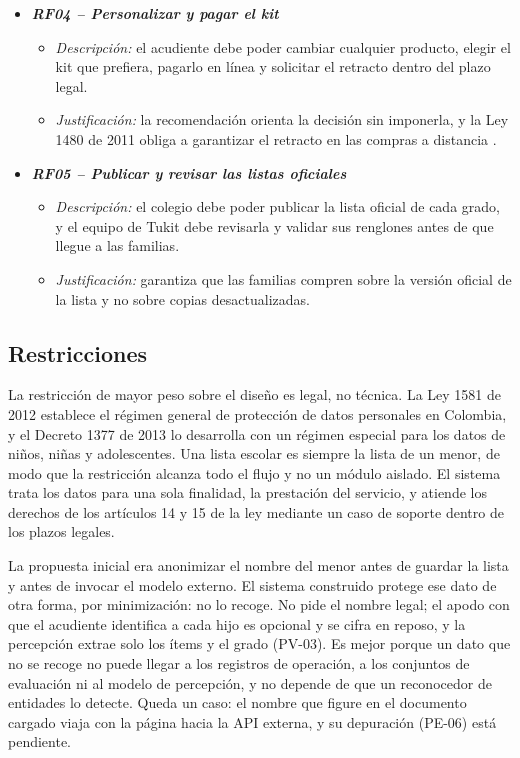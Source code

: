 \begin{itemize}
  \item \textbf{\textit{RF04 -- Personalizar y pagar el kit}}
    \begin{itemize}
      \item \textit{Descripción:} el acudiente debe poder cambiar cualquier producto, elegir
            el kit que prefiera, pagarlo en línea y solicitar el retracto dentro del plazo
            legal.
      \item \textit{Justificación:} la recomendación orienta la decisión sin imponerla, y la
            Ley 1480 de 2011 obliga a garantizar el retracto en las compras a distancia
            \citep{congreso_ley1480_2011}.
    \end{itemize}

  \item \textbf{\textit{RF05 -- Publicar y revisar las listas oficiales}}
    \begin{itemize}
      \item \textit{Descripción:} el colegio debe poder publicar la lista oficial de cada
            grado, y el equipo de Tukit debe revisarla y validar sus renglones antes de que
            llegue a las familias.
      \item \textit{Justificación:} garantiza que las familias compren sobre la versión
            oficial de la lista y no sobre copias desactualizadas.
    \end{itemize}
\end{itemize}
\subsection{Restricciones}
\label{sec:restricciones}

La restricción de mayor peso sobre el diseño es legal, no técnica. La Ley 1581 de 2012
\citep{congreso_ley1581_2012} establece el régimen general de protección de datos
personales en Colombia, y el Decreto 1377 de 2013 \citep{presidencia_decreto1377_2013} lo
desarrolla con un régimen especial para los datos de niños, niñas y adolescentes. Una lista
escolar es siempre la lista de un menor, de modo que la restricción alcanza todo el flujo y
no un módulo aislado. El sistema trata los datos para una sola finalidad, la prestación del
servicio, y atiende los derechos de los artículos 14 y 15 de la ley mediante un caso de
soporte dentro de los plazos legales.

La propuesta inicial era
anonimizar el nombre del menor antes de guardar la lista y antes de invocar el modelo
externo. El sistema construido protege ese dato de otra forma, por minimización: no lo recoge. No pide el
nombre legal; el apodo con que el acudiente identifica a cada hijo es opcional y se cifra en
reposo, y la percepción extrae solo los ítems y el grado (PV-03). Es mejor porque un dato
que no se recoge no puede llegar a los registros de operación, a los conjuntos de evaluación
ni al modelo de percepción, y no depende de que un reconocedor de entidades lo detecte.
Queda un caso: el nombre que figure en el documento cargado viaja con la página hacia la API
externa, y su depuración (PE-06) está pendiente.

